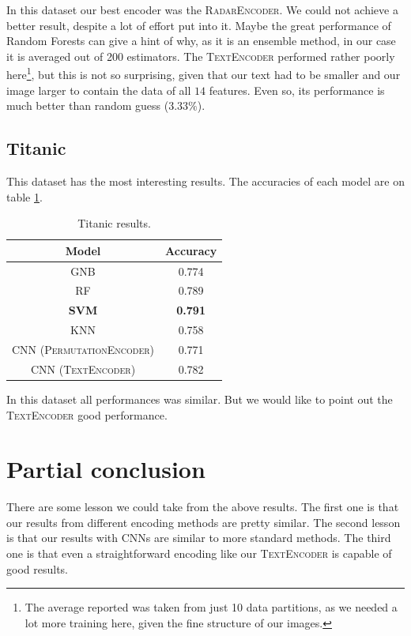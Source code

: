 \documentclass[11pt]{article}
\begin{document}
In this dataset our best encoder was the \textsc{RadarEncoder}. We could not achieve a better result, despite a lot of effort put into it. Maybe the great performance of Random Forests can give a hint of why, as it is an ensemble method, in our case it is averaged out of 200 estimators.  The \textsc{TextEncoder} performed rather poorly here\footnote{The average reported was taken from just 10 data partitions, as we needed a lot more training here, given the fine structure of our images.}, but this is not so surprising, given that our text had to be smaller and our image larger to contain the data of all $14$ features. Even so, its performance is much better than random guess ($3.33\%$).

\subsection{Titanic}
This dataset has the most interesting results. The accuracies of each model are on table \ref{table:titanic}.


\begin{table}[htp]
\centering
\begin{tabular}{|c|c|}
\hline
	Model & Accuracy \\ \hline
	GNB & 0.774\\
	RF & 0.789 \\
	\textbf{SVM} & \textbf{0.791}\\
	KNN & 0.758 \\
	CNN (\textsc{PermutationEncoder}) & 0.771 \\
	CNN (\textsc{TextEncoder}) & 0.782 \\
\hline
\end{tabular}
\caption{Titanic results.}
\label{table:titanic}
\end{table}

In this dataset all performances was similar. But we would like to point out the \textsc{TextEncoder} good performance. 

\section{Partial conclusion}
There are some lesson we could take from the above results. The first one is that our results from different encoding methods are pretty similar. The second lesson is that our results with CNNs are similar to more standard methods. The third one is that even a straightforward encoding like our \textsc{TextEncoder} is capable of good results.
\end{document}
